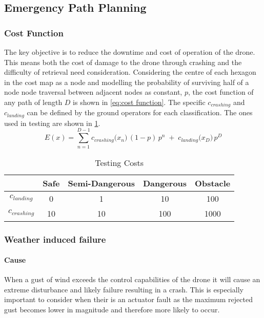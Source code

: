 \subsection{Emergency Path Planning}\label{sub_section:tgt_path_planning}

\subsubsection{Cost Function}\label{sub_sub_section:tgt_cost_function}
The key objective is to reduce the downtime and cost of operation of the drone. This means both the cost of damage to the drone through crashing and the difficulty of retrieval need consideration. Considering the centre of each hexagon in the cost map as a node and modelling the probability of surviving half of a node node traversal between adjacent nodes as constant, $p$, the cost function of any path of length $D$ is shown in \ref{eq:cost function}. The specific $c_{crashing}$ and $c_{landing}$ can be defined by the ground operators for each classification. The ones used in testing are shown in \ref{tab:cost_values}.
\begin{equation}\label{eq:cost function}
    E(x) 
    = \sum_{n=1}^{D-1} c_{crashing}\bigl(x_n\bigr)\, (1-p) \,p^n 
    \;+\; c_{landing}\bigl(x_D\bigr)\, p^D
\end{equation}
\begin{table}[h]
    \centering
    \begin{tabular}{|c|c|c|c|c|}
    \hline
         \textbf{} & \textbf{Safe} & \textbf{Semi-Dangerous} & \textbf{Dangerous} & \textbf{Obstacle} \\
         \hline
         \textbf{$c_{landing}$} & 0 & 1 & 10 & 100 \\
         \textbf{$c_{crashing}$} & 10 & 10 & 100 & 1000\\
         \hline
    \end{tabular}
    \caption{Testing Costs}
    \label{tab:cost_values}
\end{table}

\subsubsection{Weather induced failure}\label{sub_sub_section:tgt_weather_failure}
\paragraph{Cause}
When a gust of wind exceeds the control capabilities of the drone it will cause an extreme disturbance and likely failure resulting in a crash. This is especially important to consider when their is an actuator fault as the maximum rejected gust becomes lower in magnitude and therefore more likely to occur.
